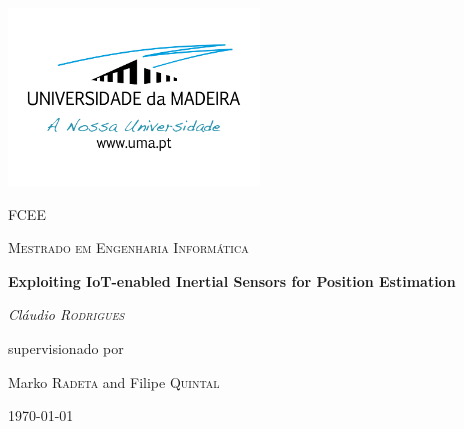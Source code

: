 \begin{titlepage}
	\centering
	\addtolength{\hoffset}{0cm}
	\centering
	\includegraphics[width=0.50\textwidth]{figures/logoUMa.png}\par\vspace{1cm}
	{\scshape\LARGE FCEE \par}
	\vspace{1cm}
	{\scshape\Large Mestrado em Engenharia Informática \par}
	\vspace{1.5cm}
	{\huge\bfseries Exploiting IoT-enabled Inertial Sensors for Position Estimation \par}
	\vspace{2cm}
	{\Large\itshape Cláudio \textsc{Rodrigues}\par}
	\vfill
	supervisionado por \par
	Marko \textsc{Radeta} and Filipe \textsc{Quintal}

	\vfill

	{\large {}\today\par}
\end{titlepage}